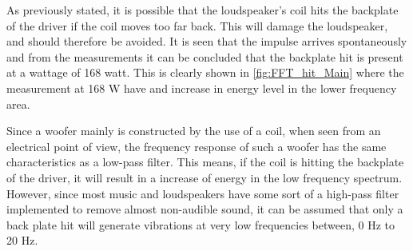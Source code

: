 As previously stated, it is possible that the loudspeaker's coil hits the backplate of the driver if the coil moves too far back. This will damage the loudspeaker, and should therefore be avoided. It is seen that the impulse arrives spontaneously and from the measurements it can be concluded that the backplate hit is present at a wattage of 168 watt. This is clearly shown in \autoref{fig:FFT_hit_Main} where the measurement at 168 W have and increase in energy level in the lower frequency area.

Since a woofer mainly is constructed by the use of a coil, when seen from an electrical point of view, the frequency response of such a woofer has the same characteristics as a low-pass filter. This means, if the coil is hitting the backplate of the driver, it will result in a increase of energy in the low frequency spectrum. However, since most music and loudspeakers have some sort of a high-pass filter implemented to remove almost non-audible sound, it can be assumed that only a back plate hit will generate vibrations at very low frequencies between, 0 Hz to 20 Hz. %


%	
%	


